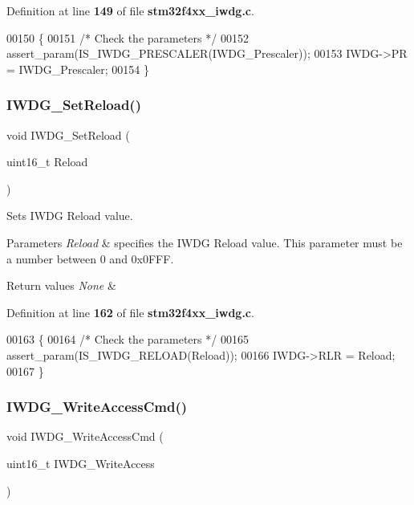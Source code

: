 Definition at line \textbf{ 149} of file \textbf{ stm32f4xx\+\_\+iwdg.\+c}.


\begin{DoxyCode}
00150 \{
00151   \textcolor{comment}{/* Check the parameters */}
00152   assert_param(IS_IWDG_PRESCALER(IWDG\_Prescaler));
00153   IWDG->PR = IWDG\_Prescaler;
00154 \}
\end{DoxyCode}
\mbox{\label{group__IWDG_gae2a14752a0431f23cb80cebf202ac365}} 
\subsubsection{I\+W\+D\+G\+\_\+\+Set\+Reload()}
{\footnotesize\ttfamily void I\+W\+D\+G\+\_\+\+Set\+Reload (\begin{DoxyParamCaption}\item[{uint16\+\_\+t}]{Reload }\end{DoxyParamCaption})}



Sets I\+W\+DG Reload value. 


\begin{DoxyParams}{Parameters}
{\em Reload} & specifies the I\+W\+DG Reload value. This parameter must be a number between 0 and 0x0\+F\+FF. \\
\hline
\end{DoxyParams}

\begin{DoxyRetVals}{Return values}
{\em None} & \\
\hline
\end{DoxyRetVals}


Definition at line \textbf{ 162} of file \textbf{ stm32f4xx\+\_\+iwdg.\+c}.


\begin{DoxyCode}
00163 \{
00164   \textcolor{comment}{/* Check the parameters */}
00165   assert_param(IS_IWDG_RELOAD(Reload));
00166   IWDG->RLR = Reload;
00167 \}
\end{DoxyCode}
\mbox{\label{group__IWDG_gae466681e5bdc11b353c508b89d75ca05}} 
\subsubsection{I\+W\+D\+G\+\_\+\+Write\+Access\+Cmd()}
{\footnotesize\ttfamily void I\+W\+D\+G\+\_\+\+Write\+Access\+Cmd (\begin{DoxyParamCaption}\item[{uint16\+\_\+t}]{I\+W\+D\+G\+\_\+\+Write\+Access }\end{DoxyParamCaption})}



